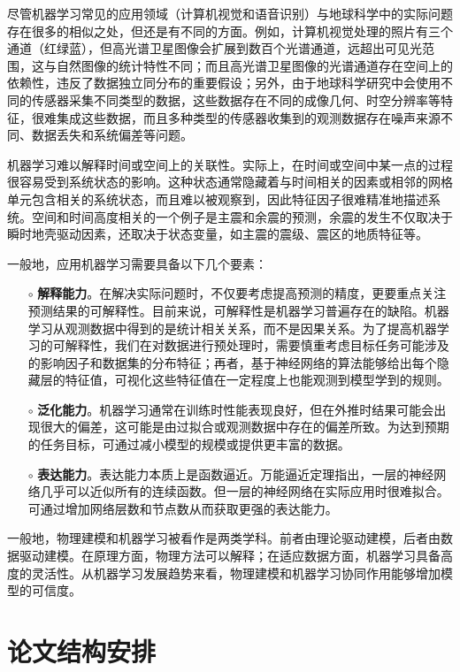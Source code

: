 尽管机器学习常见的应用领域（计算机视觉和语音识别）与地球科学中的实际问题存在很多的相似之处，但还是有不同的方面。例如，计算机视觉处理的照片有三个通道（红绿蓝），但高光谱卫星图像会扩展到数百个光谱通道，远超出可见光范围，这与自然图像的统计特性不同；而且高光谱卫星图像的光谱通道存在空间上的依赖性，违反了数据独立同分布的重要假设；另外，由于地球科学研究中会使用不同的传感器采集不同类型的数据，这些数据存在不同的成像几何、时空分辨率等特征，很难集成这些数据，而且多种类型的传感器收集到的观测数据存在噪声来源不同、数据丢失和系统偏差等问题。

机器学习难以解释时间或空间上的关联性。实际上，在时间或空间中某一点的过程很容易受到系统状态的影响。这种状态通常隐藏着与时间相关的因素或相邻的网格单元包含相关的系统状态，而且难以被观察到，因此特征因子很难精准地描述系统。空间和时间高度相关的一个例子是主震和余震的预测，余震的发生不仅取决于瞬时地壳驱动因素，还取决于状态变量，如主震的震级、震区的地质特征等。

一般地，应用机器学习需要具备以下几个要素：
\begin{enumerate}
  \item[$\circ$] \textbf{解释能力}。在解决实际问题时，不仅要考虑提高预测的精度，更要重点关注预测结果的可解释性。目前来说，可解释性是机器学习普遍存在的缺陷\citep{montavon2018methods}。机器学习从观测数据中得到的是统计相关关系，而不是因果关系\citep{runge2015identifying,reichstein2019deep}。为了提高机器学习的可解释性，我们在对数据进行预处理时，需要慎重考虑目标任务可能涉及的影响因子和数据集的分布特征；再者，基于神经网络的算法能够给出每个隐藏层的特征值，可视化这些特征值在一定程度上也能观测到模型学到的规则。
  \item[$\circ$] \textbf{泛化能力}。机器学习通常在训练时性能表现良好，但在外推时结果可能会出现很大的偏差，这可能是由过拟合或观测数据中存在的偏差所致\citep{friedlingstein2014uncertainties}。为达到预期的任务目标，可通过减小模型的规模或提供更丰富的数据。
  \item[$\circ$] \textbf{表达能力}。表达能力本质上是函数逼近。万能逼近定理指出，一层的神经网络几乎可以近似所有的连续函数。但一层的神经网络在实际应用时很难拟合。可通过增加网络层数和节点数从而获取更强的表达能力。
\end{enumerate}

一般地，物理建模和机器学习被看作是两类学科。前者由理论驱动建模，后者由数据驱动建模。在原理方面，物理方法可以解释；在适应数据方面，机器学习具备高度的灵活性。从机器学习发展趋势来看，物理建模和机器学习协同作用能够增加模型的可信度\citep{karpatne2017theory,karpatne2017physics,camps2018physics}。

\section{论文结构安排}\label{sec:intro_strcture}

